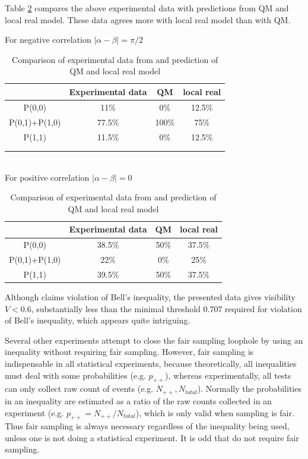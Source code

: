 \documentclass[prd,showpacs,twocolumn]{revtex4-1}
\begin{document}
Table \ref{tab:comparison}  compares the above experimental data with predictions from QM and local real model. These data agrees more with local real model than with QM.
\begin{table}
\caption{\label{tab:comparison}Comparison of experimental data from \cite{Rowe} and prediction of QM and local real model}
\begin{center}
For negative correlation $|\alpha-\beta|=\pi/2$
\begin{tabular}{cccc}
\hline
&Experimental data&QM&local real\\
\hline
P(0,0) & 11\% & 0\% & 12.5\% \\
\hline
P(0,1)+P(1,0) & 77.5\% & 100\% & 75\% \\
\hline
P(1,1) & 11.5\% & 0\% & 12.5\% \\
\hline\\\\
\end{tabular}\\
For positive correlation $|\alpha-\beta|=0$
\begin{tabular}{cccc}
\hline
&Experimental data&QM&local real\\
\hline
P(0,0) & 38.5\% & 50\% & 37.5\% \\
\hline
P(0,1)+P(1,0) & 22\% & 0\% & 25\% \\
\hline
P(1,1) & 39.5\% & 50\% & 37.5\% \\
\hline
\end{tabular}
\end{center}
\end{table}

Although \cite{Rowe} claims violation of Bell's inequality, the presented data gives visibility $V<0.6$, substantially less than the minimal threshold 0.707 required for violation of Bell's inequality, which appears quite intriguing.

Several other experiments attempt to close the fair sampling loophole by using an inequality without requiring fair sampling. However, fair sampling is indispensable in all statistical experiments, because theoretically, all inequalities must deal with some probabilities (e.g. $p_{++}$), whereas experimentally, all tests can only collect raw count of events (e.g. $N_{++},N_{total}$). Normally the probabilities in an inequality are estimated as a ratio of the raw counts collected in an experiment (e.g. $p_{++}=N_{++}/N_{total}$), which is only valid when sampling is fair. Thus fair sampling is always necessary regardless of the inequality being used, unless one is not doing a statistical experiment. It is odd that \cite{Giustina, Shalm} do not require fair sampling.
\end{document}
